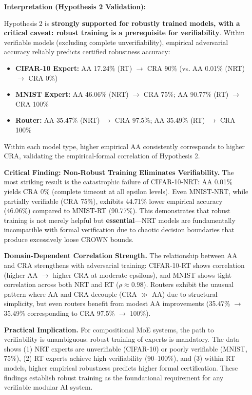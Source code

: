 \documentclass[11pt,a4paper]{article}
\begin{document}
\textbf{Interpretation (Hypothesis 2 Validation):}

Hypothesis 2 is \textbf{strongly supported for robustly trained models, with a critical caveat: robust training is a prerequisite for verifiability}. Within verifiable models (excluding complete unverifiability), empirical adversarial accuracy reliably predicts certified robustness accuracy:

\begin{itemize}
    \item \textbf{CIFAR-10 Expert:} AA 17.24\% (RT) $\to$ CRA 90\% (vs. AA 0.01\% (NRT) $\to$ CRA 0\%)
    \item \textbf{MNIST Expert:} AA 46.06\% (NRT) $\to$ CRA 75\%; AA 90.77\% (RT) $\to$ CRA 100\%
    \item \textbf{Router:} AA 35.47\% (NRT) $\to$ CRA 97.5\%; AA 35.49\% (RT) $\to$ CRA 100\%
\end{itemize}

Within each model type, higher empirical AA consistently corresponds to higher CRA, validating the empirical-formal correlation of Hypothesis 2.

\textbf{Critical Finding: Non-Robust Training Eliminates Verifiability.} The most striking result is the catastrophic failure of CIFAR-10-NRT: AA 0.01\% yields CRA 0\% (complete timeout at all epsilon levels). Even MNIST-NRT, while partially verifiable (CRA 75\%), exhibits 44.71\% lower empirical accuracy (46.06\%) compared to MNIST-RT (90.77\%). This demonstrates that robust training is not merely helpful but \textbf{essential}—NRT models are fundamentally incompatible with formal verification due to chaotic decision boundaries that produce excessively loose CROWN bounds.

\textbf{Domain-Dependent Correlation Strength.} The relationship between AA and CRA strengthens with adversarial training: CIFAR-10-RT shows correlation (higher AA $\to$ higher CRA at moderate epsilons), and MNIST shows tight correlation across both NRT and RT ($\rho \approx 0.98$). Routers exhibit the unusual pattern where AA and CRA decouple (CRA $\gg$ AA) due to structural simplicity, but even routers benefit from modest AA improvements (35.47\% $\to$ 35.49\% corresponding to CRA 97.5\% $\to$ 100\%).

\textbf{Practical Implication.} For compositional MoE systems, the path to verifiability is unambiguous: robust training of experts is mandatory. The data shows (1) NRT experts are unverifiable (CIFAR-10) or poorly verifiable (MNIST, 75\%), (2) RT experts achieve high verifiability (90--100\%), and (3) within RT models, higher empirical robustness predicts higher formal certification. These findings establish robust training as the foundational requirement for any verifiable modular AI system.
\end{document}
